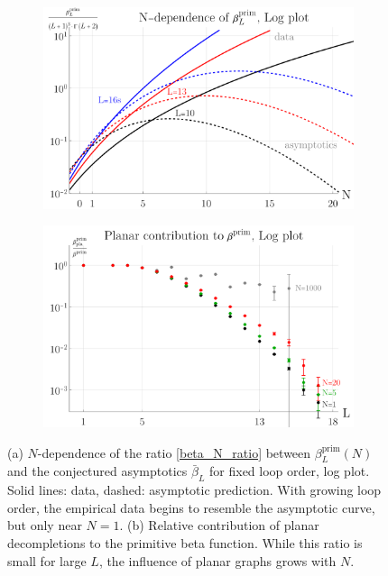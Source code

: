 \documentclass[12pt,a4paper]{article}
\renewcommand{\|}{\rule[-0.4ex]{0.2ex}{1.2em}}
\begin{document}
\begin{figure}[htb]
	\centering
	\begin{subfigure}[b]{.49 \textwidth}
		\includegraphics[width=\linewidth]{beta_N_dependence}
		\subcaption{}
		\label{fig:beta_N_dependence}
	\end{subfigure}
	\begin{subfigure}[b]{.49 \textwidth}
		\includegraphics[width=\linewidth]{beta_planar_relative}
		\subcaption{}
		\label{fig:beta_planar_relative}
	\end{subfigure}
	
	\caption{(a) $N$-dependence of the ratio \cref{beta_N_ratio} between   $\beta^{\text{prim}}_L(N)$ and the conjectured asymptotics $\bar \beta_L$ for fixed loop order, log plot. Solid lines: data, dashed: asymptotic prediction. With growing loop order, the empirical data begins to resemble the asymptotic curve, but  only near $N=1$.
		(b) Relative contribution of planar decompletions to the primitive beta function. While this ratio is small for large $L$, the influence of planar graphs grows with $N$.  
	}
\end{figure}
\end{document}
